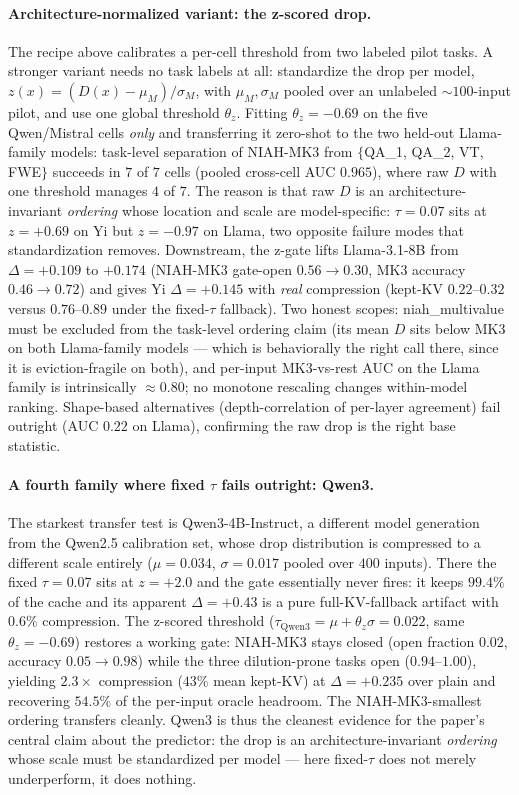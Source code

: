 \documentclass{article}
\begin{document}
\paragraph{Architecture-normalized variant: the z-scored drop.} The recipe
above calibrates a per-cell threshold from two labeled pilot tasks. A
stronger variant needs no task labels at all: standardize the drop
per model, $z(x) = (D(x) - \mu_M) / \sigma_M$, with $\mu_M, \sigma_M$
pooled over an unlabeled $\sim 100$-input pilot, and use one global
threshold $\theta_z$. Fitting $\theta_z = -0.69$ on the five Qwen/Mistral
cells \emph{only} and transferring it zero-shot to the two held-out
Llama-family models: task-level separation of NIAH-MK3 from
$\{$QA\_1, QA\_2, VT, FWE$\}$ succeeds in $7$ of $7$ cells (pooled
cross-cell AUC $0.965$), where raw $D$ with one threshold manages $4$ of
$7$. The reason is that raw $D$ is an architecture-invariant
\emph{ordering} whose location and scale are model-specific: $\tau = 0.07$
sits at $z = +0.69$ on Yi but $z = -0.97$ on Llama, two opposite failure
modes that standardization removes. Downstream, the z-gate lifts
Llama-3.1-8B from $\Delta = +0.109$ to $\boldsymbol{+0.174}$ (NIAH-MK3
gate-open $0.56 \to 0.30$, MK3 accuracy $0.46 \to 0.72$) and gives Yi
$\Delta = +0.145$ with \emph{real} compression (kept-KV $0.22$--$0.32$
versus $0.76$--$0.89$ under the fixed-$\tau$ fallback). Two honest
scopes: niah\_multivalue must be excluded from the task-level ordering
claim (its mean $D$ sits below MK3 on both Llama-family models --- which
is behaviorally the right call there, since it is eviction-fragile on
both), and per-input MK3-vs-rest AUC on the Llama family is
intrinsically $\approx 0.80$; no monotone rescaling changes within-model
ranking. Shape-based alternatives (depth-correlation of per-layer
agreement) fail outright (AUC $0.22$ on Llama), confirming the raw drop
is the right base statistic.

\paragraph{A fourth family where fixed $\tau$ fails outright: Qwen3.} The
starkest transfer test is Qwen3-4B-Instruct, a different model generation
from the Qwen2.5 calibration set, whose drop distribution is compressed to
a different scale entirely ($\mu = 0.034$, $\sigma = 0.017$ pooled over
$400$ inputs). There the fixed $\tau = 0.07$ sits at $z = +2.0$ and the
gate essentially never fires: it keeps $99.4\%$ of the cache and its
apparent $\Delta = +0.43$ is a pure full-KV-fallback artifact with
$0.6\%$ compression. The z-scored threshold ($\tau_{\text{Qwen3}} = \mu +
\theta_z \sigma = 0.022$, same $\theta_z = -0.69$) restores a working
gate: NIAH-MK3 stays closed (open fraction $0.02$, accuracy $0.05 \to
0.98$) while the three dilution-prone tasks open ($0.94$--$1.00$),
yielding $2.3\times$ compression ($43\%$ mean kept-KV) at
$\Delta = +0.235$ over plain and recovering $54.5\%$ of the per-input
oracle headroom. The NIAH-MK3-smallest ordering transfers cleanly.
Qwen3 is thus the cleanest evidence for the paper's central claim about
the predictor: the drop is an architecture-invariant \emph{ordering}
whose scale must be standardized per model --- here fixed-$\tau$ does not
merely underperform, it does nothing.
\end{document}
